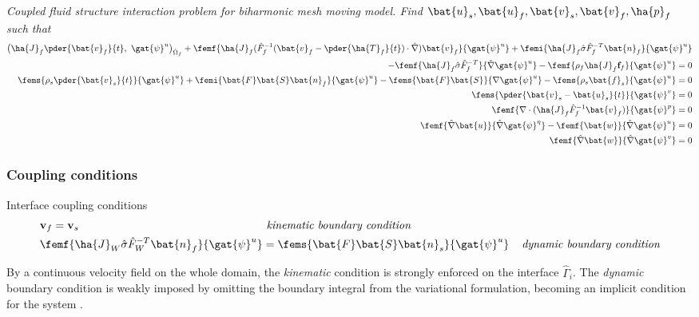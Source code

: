 \begin{prob}
\textit{Coupled fluid structure interaction problem for biharmonic mesh moving model.
Find $\bat{u}_s, \bat{u}_f, \bat{v}_s, \bat{v}_f, \ha{p}_f $ such that}
\begin{align*}
\big(\ha{J}_f \pder{\bat{v}_f}{t}, \ \gat{\psi}^u \big)_{\hat{\Omega}_f} +
\femf{\ha{J}_f (\hat{F}_f^{-1}(\bat{v}_f - \pder{\ha{T}_f}{t}) \cdot \hat{\nabla}) \bat{v}_f}{\gat{\psi}^u}
+ \femi{\ha{J}_f \hat{\sigma}\hat{F}_f^{-T} \bat{n}_f}{\gat{\psi}^u} \\
- \femf{\ha{J}_f \hat{\sigma}\hat{F}_f^{-T}}{\hat{\nabla}\gat{\psi}^u} -
\femf{\rho_f \ha{J}_f \mathbf{f}_f}{{\gat{\psi}^u}} = 0 \\
\fems{\rho_s \pder{\bat{v}_s}{t}}{\gat{\psi}^u} + \femi{\bat{F}\bat{S}\bat{n}_f}{\gat{\psi}^u}
- \fems{\bat{F}\bat{S}}{\nabla \gat{\psi}^u} - \fems{\rho_s \bat{f}_s}{\gat{\psi}^u} = 0 \\
\fems{\pder{\bat{v}_s - \bat{u}_s}{t}}{\gat{\psi}^v}  = 0\\
\femf{\nabla \cdot (\ha{J}_f \hat{F}_f^{-1} \bat{v}_f)}{\gat{\psi}^p} = 0 \\
\femf{\hat{\nabla}\bat{u}}{\hat{\nabla}\gat{\psi}^{\eta}} - 
\femf{\bat{w}}{\hat{\nabla}\gat{\psi}^u} = 0 \\
\femf{\hat{\nabla}\bat{w}}{\hat{\nabla}\gat{\psi}^{v}} = 0
\end{align*}
\end{prob}
\subsubsection*{Coupling conditions}
\begin{equat}
Interface coupling conditions
\begin{align*}
&\mathbf{v}_f = \mathbf{v}_s  \hspace{5.9cm} \textit{kinematic boundary condition} \\
& \femf{\ha{J}_W \hat{\sigma}\hat{F}_W^{-T} \bat{n}_f}{\gat{\psi}^u} = 
 \fems{\bat{F}\bat{S} \bat{n}_s}{\gat{\psi}^u}  \hspace{4mm} \textit{dynamic boundary condition} 
\end{align*} 
\end{equat}
By a continuous velocity field on the whole domain, the \textit{kinematic} condition is strongly enforced on the interface $\hat{\Gamma}_i$.
The \textit{dynamic} boundary condition is  weakly imposed by omitting the boundary integral from the variational formulation, becoming an implicit condition for the system  \cite{Wick}. \\
